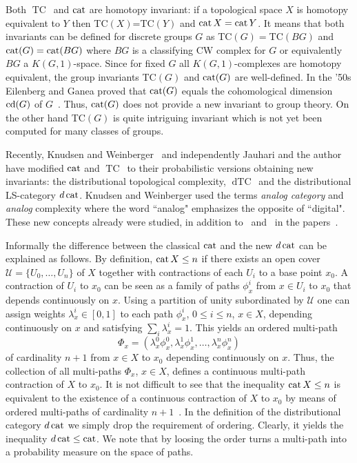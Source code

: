 \documentclass{amsart}
\numberwithin{equation}{section}
\theoremstyle{plain}
\theoremstyle{definition}
\def\TC{{\mathop\mathrm{TC}\,}}
\def\dTC{{\mathop\mathrm{dTC}\,}}
\def\cat{\protect\operatorname{cat}}
\def\cd{\protect\operatorname{cd}}
\begin{document}
Both $\TC$ and $\cat$ are homotopy invariant: if a topological space $X$ is homotopy equivalent to $Y$ then
TC$(X)$=TC$(Y)$ and $\cat X=\cat Y$.  It means that both invariants can be defined for discrete groups $G$ as TC$(G)=$TC$(BG)$ and $\cat(G)=\cat(BG)$ where $BG$ is a classifying CW complex for $G$ or equivalently $BG$  a $K(G,1)$-space. Since for fixed $G$ all $K(G,1)$-complexes are homotopy equivalent, the group invariants
TC$(G)$ and $\cat(G)$ are well-defined. In the '50s Eilenberg and Ganea proved that $\cat(G)$ equals the cohomological dimension $\cd(G)$ of $G$~\cite{EG}.
Thus, $\cat(G)$ does not provide a new invariant to group theory. On the other hand TC$(G)$ is quite intriguing invariant which is not yet been computed for many classes of groups.

Recently, Knudsen and Weinberger~\cite{KW1} and independently Jauhari and the author~\cite{DJ} have modified $\cat$ and $\TC$ to their probabilistic versions obtaining new invariants:
 the distributional topological complexity, $\dTC$ and the distributional LS-category $d\cat$. Knudsen and Weinberger used the terms {\em analog category} and {\em analog} complexity where 
the word ``analog"  emphasizes the opposite of ``digital". These new concepts already were studied, in addition to~\cite{DJ} and~\cite{KW1} in the papers~\cite{Dr2, KW2, J1, J2, JO1, JO2, DaJ}.

Informally the difference between the classical $\cat$ and the new $d\cat$ can be explained as follows. 
By definition, $\cat X\le n$ if there exists an open cover $\mathcal U=\{U_0,\dots,U_n\}$ of $X$ together with contractions of each $U_i$ to a base point $x_0$. A contraction of $U_i$ to $x_0$ can be seen as a family of paths $\phi_x^i$ from $x\in U_i$ to $x_0$ that depends continuously on $x$. Using  a partition of unity subordinated by $\mathcal U$ one can assign weights $\lambda_x^i\in[0,1]$ to each path $\phi_x^i$, $0\le i\le n$, $x\in X$, depending continuously on $x$ and satisfying $\sum_i\lambda_x^i=1$.
This yields an ordered multi-path $$\Phi_x=(\lambda_x^0\phi_x^0,\lambda_x^1\phi_x^1,\dots,\lambda_x^n\phi_x^n)$$ of cardinality $n+1$ from $x\in X$ to $x_0$ depending continuously on $x$. Thus, the collection of all multi-paths $\Phi_x$, $x\in X$, defines a continuous multi-path contraction of $X$ to $x_0$. It is not difficult to see that the inequality $\cat X\le n$ is equivalent to the existence of a continuous contraction of $X$ to $x_0$ by means of ordered multi-paths of cardinality $n+1$~\cite{F3}. In the definition of the distributional category $d\cat$ we simply drop the requirement of ordering. Clearly, it yields the inequality $d\cat\le\cat$. We note that by loosing the order turns a multi-path into a probability measure on the space of paths. 
\end{document}
